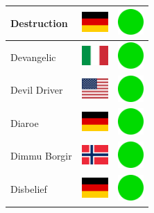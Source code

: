 \documentclass[12pt, a4paper, twoside]{report}
\begin{document}
\begin{center}
\begin{longtable}{|p{5cm}|p{2cm}|p{2cm}|}
Destruction & \includegraphics[width=1cm]{4x3/de} & \includegraphics[width=1cm]{likes/y} \\ \hline
Devangelic & \includegraphics[width=1cm]{4x3/it} & \includegraphics[width=1cm]{likes/y} \\ \hline
Devil Driver & \includegraphics[width=1cm]{4x3/us} & \includegraphics[width=1cm]{likes/y} \\ \hline
Diaroe & \includegraphics[width=1cm]{4x3/de} & \includegraphics[width=1cm]{likes/y} \\ \hline
Dimmu Borgir & \includegraphics[width=1cm]{4x3/no} & \includegraphics[width=1cm]{likes/y} \\ \hline
Disbelief & \includegraphics[width=1cm]{4x3/de} & \includegraphics[width=1cm]{likes/y} \\ \hline

\end{longtable}
\end{center}
\end{document}
